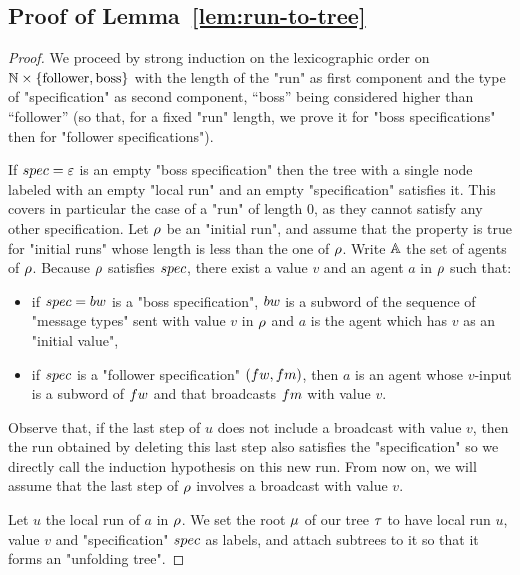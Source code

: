 \subsection{Proof of Lemma~\ref{lem:run-to-tree}}

\LemRunToTree*

\begin{proof}
	
	We proceed by strong induction on the lexicographic order on $\mathbb{N} \times \{\text{follower}, \text{boss}\}$ with the length of the "run" as first component and the type of "specification" as second component, ``boss'' being considered higher than ``follower'' (so that, for a fixed "run" length, we prove it for "boss specifications" then for "follower specifications"). 
	
	If $\spec = \epsilon$ is an empty "boss specification" then the tree with a single node labeled with an empty "local run" and an empty "specification" satisfies it.
	This covers in particular the case of a "run" of length $0$, as they cannot satisfy any other specification.
	Let $\rho$ be an "initial run", and assume that the property is true for "initial runs" whose length is less than the one of $\rho$. Write $\mathbb{A}$ the set of agents of $\rho$.
	Because $\rho$ satisfies $\spec$, there exist a value $v$ and an agent $a$ in $\rho$ such that:
	\begin{itemize}
	\item if $\spec= \bossspec$ is a "boss specification", $\bossspec$ is a subword of the sequence of "message types" sent with value $v$ in $\rho$ and $a$ is the agent which has $v$ as an "initial value",
	\item if $\spec$ is a "follower specification" $(\followwordspec, \followmessagespec)$, then $a$ is an agent whose $v$-input is a subword of $\followwordspec$ and that broadcasts $\followmessagespec$ with value $v$. 
	\end{itemize}

	Observe that, if the last step of $u$ does not include a broadcast with value $v$, then the run obtained by deleting this last step also satisfies the "specification" so we directly call the induction hypothesis on this new run. From now on, we will assume that the last step of $\rho$ involves a broadcast with value $v$. 

	Let $u$ the local run of $a$ in $\rho$. We set the root $\mu$ of our tree $\tau$ to have local run $u$, value $v$ and "specification" $\spec$ as labels, and attach subtrees to it so that it forms an "unfolding tree".


\end{proof}
